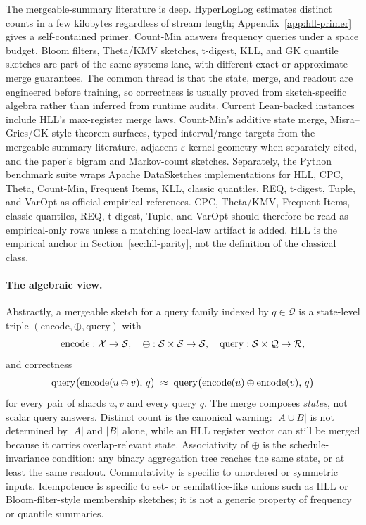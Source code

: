 The mergeable-summary literature is deep. HyperLogLog
\citep{FlajoletEtAl2007,HeuleEtAl2013} estimates distinct counts in a
few kilobytes regardless of stream length; Appendix~\ref{app:hll-primer}
gives a self-contained primer. Count-Min
\citep{CormodeMuthukrishnan2005} answers frequency queries under a
space budget. Bloom filters, Theta/KMV sketches, t-digest, KLL, and GK
quantile sketches are part of the same systems lane, with different
exact or approximate merge guarantees. The common thread is that the
state, merge, and readout are engineered before training, so
correctness is usually proved from sketch-specific algebra rather than
inferred from runtime audits. Current Lean-backed instances include
HLL's max-register merge laws, Count-Min's additive state merge,
Misra--Gries/GK-style theorem surfaces, typed
interval/range targets from the mergeable-summary literature, adjacent
$\varepsilon$-kernel geometry when separately cited, and the paper's bigram
and Markov-count sketches.
Separately, the Python benchmark suite wraps Apache DataSketches
implementations for HLL, CPC, Theta, Count-Min, Frequent Items, KLL,
classic quantiles, REQ, t-digest, Tuple, and VarOpt as official
empirical references. CPC, Theta/KMV, Frequent Items, classic
quantiles, REQ, t-digest, Tuple, and VarOpt should therefore be read
as empirical-only rows unless a matching local-law artifact is added.
HLL is the empirical anchor in Section~\ref{sec:hll-parity}, not the
definition of the classical class.

\paragraph{The algebraic view.}
Abstractly, a mergeable sketch for a query family indexed by $q \in
\mathcal{Q}$ is a state-level triple $(\mathrm{encode}, \oplus,
\mathrm{query})$ with
\[
\mathrm{encode} : \mathcal{X} \to \mathcal{S}, \quad
\oplus : \mathcal{S} \times \mathcal{S} \to \mathcal{S}, \quad
\mathrm{query} : \mathcal{S} \times \mathcal{Q} \to \mathcal{R},
\]
and correctness
\[
\mathrm{query}\big(\mathrm{encode}(u \oplus v),\, q\big)
\;\approx\;
\mathrm{query}\big(\mathrm{encode}(u) \oplus \mathrm{encode}(v),\, q\big)
\]
for every pair of shards $u, v$ and every query $q$. The merge
composes \emph{states}, not scalar query answers. Distinct count is
the canonical warning: $|A \cup B|$ is not determined by $|A|$ and
$|B|$ alone, while an HLL register vector can still be merged because
it carries overlap-relevant state. Associativity of $\oplus$ is the
schedule-invariance condition: any binary aggregation tree reaches the
same state, or at least the same readout. Commutativity is specific to
unordered or symmetric inputs. Idempotence is specific to set- or
semilattice-like unions such as HLL or Bloom-filter-style membership
sketches; it is not a generic property of frequency or quantile
summaries.

